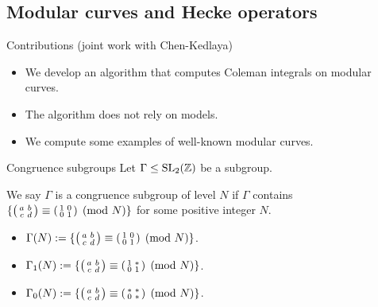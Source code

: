 \subsection{Modular curves and Hecke operators}

\begin{frame}{Contributions (joint work with Chen-Kedlaya)}
\begin{itemize}
\item We develop an algorithm that computes Coleman integrals on modular curves.
\item The algorithm does not rely on models.
\item We compute some examples of well-known modular curves.
\end{itemize}
\end{frame}

\begin{frame}{Congruence subgroups}
Let $\Gamma \leq \operatorname{SL}_2(\mathbb{Z})$ be a subgroup. 

\begin{definition}
We say $\Gamma$ is a congruence subgroup of level $N$ if $\Gamma$ contains $\{ \begin{psmallmatrix} a & b \\ c & d \end{psmallmatrix} \equiv \begin{psmallmatrix} 1 & 0 \\ 0 & 1 \end{psmallmatrix} \pmod{N} \}$ for some positive integer $N$.
\end{definition}

\pause
\begin{itemize}
\item $\Gamma(N) := \{ \begin{psmallmatrix} a & b \\ c & d \end{psmallmatrix} \equiv \begin{psmallmatrix} 1 & 0 \\ 0 & 1 \end{psmallmatrix} \pmod{N} \}$.
\item $\Gamma_1(N) := \{ \begin{psmallmatrix} a & b \\ c & d \end{psmallmatrix} \equiv \begin{psmallmatrix} 1 & \ast \\ 0 & 1 \end{psmallmatrix} \pmod{N} \}$.
\item $\Gamma_0(N) := \{ \begin{psmallmatrix} a & b \\ c & d \end{psmallmatrix} \equiv \begin{psmallmatrix} \ast & \ast \\ 0 & \ast \end{psmallmatrix} \pmod{N} \}$.
\end{itemize}
\end{frame}

